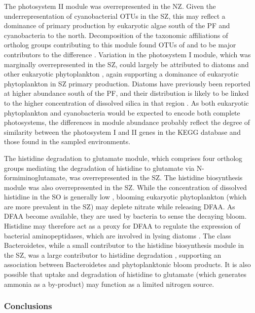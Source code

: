 The photosystem II module was overrepresented in the \ac{NZ}.
Given the underrepresentation of cyanobacterial \acp{OTU} in the \ac{SZ}, this may reflect a dominance of primary production by eukaryotic algae south of the \ac{PF} and cyanobacteria to the north.
Decomposition of the taxonomic affiliations of ortholog groups contributing to this module found \acp{OTU} of  and  to be major contributors to the difference .
Variation in the photosystem I module, which was marginally overrepresented in the \ac{SZ}, could largely be attributed to diatoms and other eukaryotic phytoplankton , again supporting a dominance of eukaryotic phytoplankton in \ac{SZ} primary production.
Diatoms have previously been reported at higher abundance south of the \ac{PF}, and their distribution is likely to be linked to the higher concentration of dissolved silica in that region \cite{Trull:2001tg}.
As both eukaryotic phytoplankton and cyanobacteria would be expected to encode both complete photosystems, the differences in module abundance probably reflect the degree of similarity between the photosystem I and II genes in the \ac{KEGG} database and those found in the sampled environments. 

The histidine degradation to glutamate module, which comprises four ortholog groups mediating the degradation of histidine to glutamate via N-formiminoglutamate, was overrepresented in the \ac{SZ}.
The histidine biosynthesis module was also overrepresented in the \ac{SZ}.
While the concentration of dissolved histidine in the \ac{SO} is generally low \cite{Kawahata:2000ur}, blooming eukaryotic phytoplankton (which are more prevalent in the \ac{SZ}) may deplete nitrate while releasing \ac{DFAA}.
As \ac{DFAA} become available, they are used by bacteria to sense the decaying bloom. 
Histidine may therefore act as a proxy for \ac{DFAA} to regulate the expression of bacterial aminopeptidases, which are involved in lysing diatoms \cite{Bidle:2001vi}.
The class Bacteroidetes, while a small contributor to the histidine biosynthesis module in the \ac{SZ}, was a large contributor to histidine degradation , supporting an association between Bacteroidetes and phytoplanktonic bloom products. 
It is also possible that uptake and degradation of histidine to glutamate (which generates ammonia as a by-product) may function as a limited nitrogen source.

\subsubsection{Conclusions}

